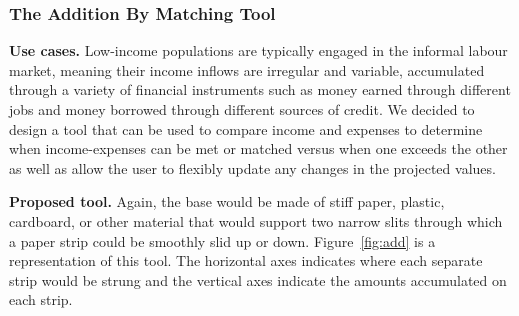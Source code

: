 \documentclass{sig-alternate}
\begin{document}




\subsubsection{The Addition By Matching Tool}
\label{sec:add}

\textbf{Use cases.} Low-income populations are typically engaged in the informal labour market, meaning their income inflows are irregular and variable, accumulated through a variety of financial instruments such as money earned through different jobs and money borrowed through different sources of credit. We decided to design a tool that can be used to compare income and expenses to determine when income-expenses can be met or matched versus when one exceeds the other as well as allow the user to flexibly update any changes in the projected values.

\textbf{Proposed tool.} Again, the base would be made of stiff paper, plastic, cardboard, or other material that would support two narrow slits through which a paper strip could be smoothly slid up or down. Figure~\ref{fig:add} is a representation of this tool. The horizontal axes indicates where each separate strip would be strung and the vertical axes indicate the amounts accumulated on each strip.
\end{document}
